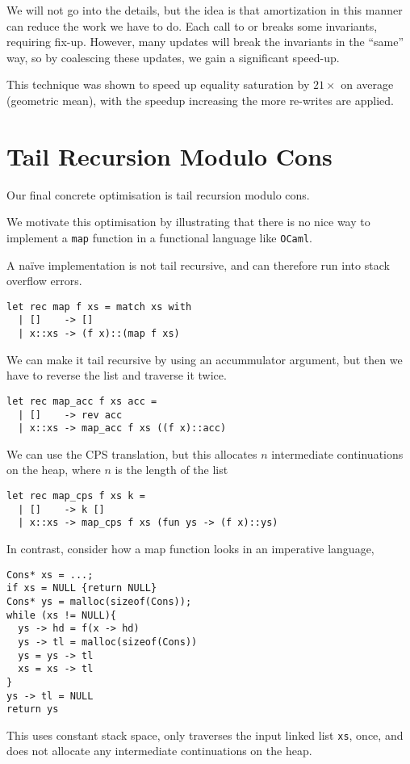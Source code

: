 We will not go into the details, but the idea is that amortization in this manner can reduce the work we have to do. Each call to  or 
breaks some invariants, requiring fix-up. However, many updates will break the invariants in the ``same'' way, so by coalescing these updates, we gain a significant speed-up. 

This technique was shown to speed up equality saturation by $21\times$ on average (geometric mean), with the speedup increasing the more re-writes are applied.

\section{Tail Recursion Modulo Cons}
Our final concrete optimisation is tail recursion modulo cons. 

We motivate this optimisation by illustrating that there is no nice way to implement a \texttt{map} function in a functional language like \texttt{OCaml}. 

A naïve implementation is not tail recursive, and can therefore run into stack overflow errors.
\begin{verbatim}
let rec map f xs = match xs with
  | []    -> []
  | x::xs -> (f x)::(map f xs)
\end{verbatim}
We can make it tail recursive by using an accummulator argument, but then we have to reverse the list and traverse it twice. 
\begin{verbatim}
let rec map_acc f xs acc =
  | []    -> rev acc
  | x::xs -> map_acc f xs ((f x)::acc)
\end{verbatim}
We can use the CPS translation, but this allocates $n$ intermediate continuations on the heap, where $n$ is the length of the list
\begin{verbatim}
let rec map_cps f xs k =
  | []    -> k []
  | x::xs -> map_cps f xs (fun ys -> (f x)::ys)
\end{verbatim}

In contrast, consider how a map function looks in an imperative language,
\begin{verbatim}
Cons* xs = ...;
if xs = NULL {return NULL}
Cons* ys = malloc(sizeof(Cons));
while (xs != NULL){
  ys -> hd = f(x -> hd)
  ys -> tl = malloc(sizeof(Cons))
  ys = ys -> tl
  xs = xs -> tl
}
ys -> tl = NULL
return ys
\end{verbatim}
This uses constant stack space, only traverses the input linked list \texttt{xs}, once, and does not allocate any intermediate continuations on the heap. 

